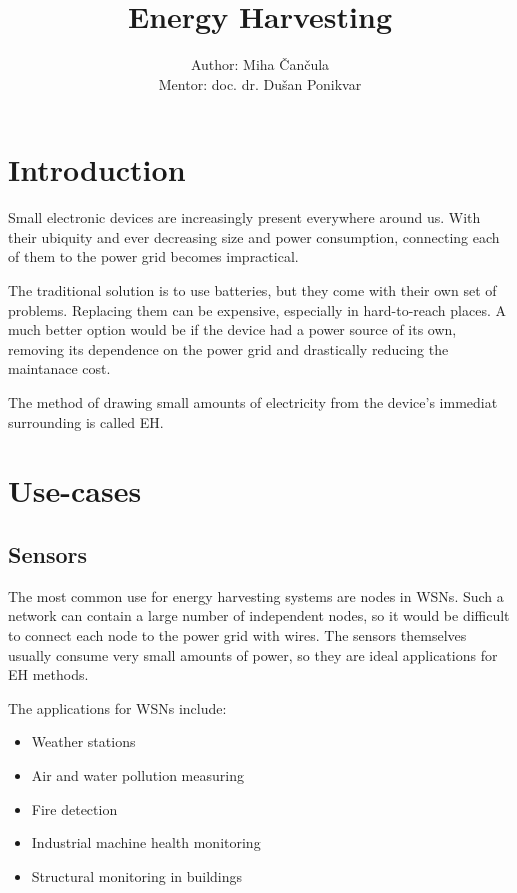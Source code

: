 \documentclass[a4paper,10pt]{article}
\title{Energy Harvesting}
\author{Author: Miha \v Can\v cula \\ Mentor: doc. dr. Du\v san Ponikvar}
\begin{document}
\maketitle

\begin{abstract}

\end{abstract}

\section{Introduction}

Small electronic devices are increasingly present everywhere around us. With their ubiquity and ever decreasing size and power consumption, connecting each of them to the power grid becomes impractical. 

The traditional solution is to use batteries, but they come with their own set of problems. Replacing them can be expensive, especially in hard-to-reach places. A much better option would be if the device had a power source of its own, removing its dependence on the power grid and drastically reducing the maintanace cost. 

The method of drawing small amounts of electricity from the device's immediat surrounding is called \ac{EH}. 

\section{Use-cases}

\subsection{Sensors}

The most common use for energy harvesting systems are nodes in \acp{WSN}. Such a network can contain a large number of independent nodes, so it would be difficult to connect each node to the power grid with wires. The sensors themselves usually consume very small amounts of power, so they are ideal applications for \acl{EH} methods. 

The applications for \acp{WSN} include:
\begin{itemize}
  \item Weather stations
  \item Air and water pollution measuring
  \item Fire detection
  \item Industrial machine health monitoring
  \item Structural monitoring in buildings
\end{itemize}
\end{document}
